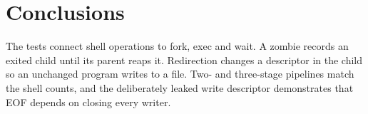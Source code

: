 \chapter{Conclusions}

The tests connect shell operations to fork, exec and wait. A zombie records an exited child until its parent reaps it. Redirection changes a descriptor in the child so an unchanged program writes to a file. Two- and three-stage pipelines match the shell counts, and the deliberately leaked write descriptor demonstrates that EOF depends on closing every writer.
